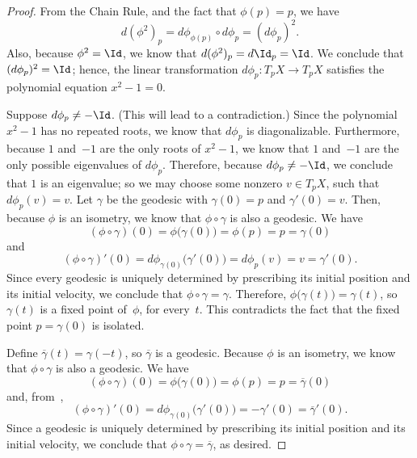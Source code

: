 \begin{proof}
  From the Chain Rule, and the fact that $\phi(p) =
p$, we have
 $$ d(\phi^2)_p = d\phi_{\phi(p)} \circ d\phi_p = (d\phi_p)^2 .$$
 Also, because $\phi^2 = \Id$, we know that $d(\phi^2)_p = d \Id_p =
\Id$. We conclude that $(d\phi_p)^2 = \Id$; hence, the linear
transformation $d\phi_p \colon T_p X \to T_p X$ satisfies the polynomial
equation $x^2 - 1 = 0$. 

Suppose $d\phi_p \neq -\Id$. (This will lead to a contradiction.)
Since the polynomial $x^2 - 1$ has no repeated roots, we know that
$d\phi_p$ is diagonalizable. Furthermore, because $1$ and~$-1$ are
the only roots of $x^2 - 1$, we know that $1$ and~$-1$ are the only
possible eigenvalues of $d\phi_p$. Therefore, because $d\phi_p \neq -\Id$,
we conclude that $1$ is an eigenvalue; so we may choose some
nonzero $v \in T_p X$, such that $d\phi_p(v) = v$. Let $\gamma$ be the
geodesic with $\gamma(0) = p$ and $\gamma'(0) = v$. Then, because
$\phi$ is an isometry, we know that $\phi \circ \gamma$ is also a
geodesic. We have 
 $$(\phi \circ \gamma)(0) = \phi \bigl( \gamma(0) \bigr)
 = \phi(p) = p = \gamma(0) $$
 and
 $$ (\phi \circ \gamma)'(0)
 = d \phi_{\gamma(0)} \bigl( \gamma'(0) \bigr)
 = d \phi_p (v)
 = v
 = \gamma'(0) .$$
 Since every geodesic is uniquely determined by prescribing its initial
position and its initial velocity, we conclude that $\phi \circ \gamma
= \gamma$. Therefore, $\phi \bigl( \gamma(t) \bigr) = \gamma(t)$, so
$\gamma(t)$ is a fixed point of~$\phi$, for every~$t$. This
contradicts the fact that the fixed point $p = \gamma(0)$ is isolated.

 Define $\overline{\gamma}(t) = \gamma(-t)$, so
$\overline{\gamma}$ is a geodesic. Because $\phi$ is an isometry, we
know that $\phi \circ \gamma$ is also a geodesic. We have
 $$(\phi \circ \gamma)(0) = \phi \bigl( \gamma(0) \bigr)
 = \phi(p) = p = \overline{\gamma}(0) $$
 and, from~,
 $$ (\phi \circ \gamma)'(0)
 = d \phi_{\gamma(0)} \bigl( \gamma'(0) \bigr)
 = -\gamma'(0)
 = \overline{\gamma}'(0) .$$
 Since a geodesic is uniquely determined by prescribing its initial
position and its initial velocity, we conclude that $\phi \circ
\gamma = \overline{\gamma}$, as desired.
 \end{proof}

